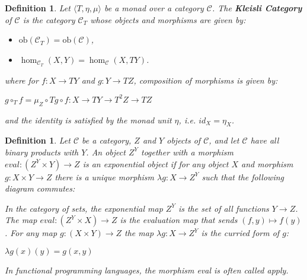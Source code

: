 \documentclass[11pt]{report}
\newcommand{\mcC}{\mathcal{C}}
\newcommand{\ob}{\text{ob}}
\newtheorem{defn}[thm]{Definition} %
\begin{document}
\begin{defn}
  Let $\langle T, \eta, \mu \rangle$ be a monad over a category $\mcC$. The \textbf{Kleisli Category }of $\mcC$ is the category $\mcC_T$ whose objects and morphisms are given by:
  \begin{itemize}
  \item $\ob(\mcC_T) = \ob(\mcC)$,
  \item $\hom_{\mcC_T}(X, Y) = \hom_{\mcC}(X, TY)$.
  \end{itemize}
  where for $f: X \to TY$ and $g: Y \to TZ$, composition of morphisms is given by:
  \begin{center}
    $g \circ_T f = \mu_Z \circ Tg \circ f: X \to TY \to T^2Z \to TZ$
  \end{center}
  and the identity is satisfied by the monad unit $\eta$, i.e. $id_X = \eta_X$.
\end{defn}

\begin{defn}
  Let $\mcC$ be a category, $Z$ and $Y$ objects of $\mcC$, and let $\mcC$ have all binary products with $Y$. An object $Z^Y$ together with a morphism $eval: (Z^Y \times Y) \to Z$ is an exponential object if for any object $X$ and morphism $g: X \times Y \to Z$ there is a unique morphism $\lambda g : X \to Z^Y$ such that the following diagram commutes: 
  \begin{center}
  \end{center} 
  In the category of sets, the exponential map $Z^Y$ is the set of all functions $Y \to Z$. The map $eval:(Z^Y \times X) \to Z$ is the evaluation map that sends $(f, y) \mapsto f(y)$. For any map $g: (X \times Y) \to Z$ the map
  $\lambda g: X \to Z^Y$ is the curried form of $g$:
  \begin{center}
    $\lambda g(x)(y) = g(x,y)$
  \end{center}
  In functional programming languages, the morphism eval is often called apply.
\end{defn}
\end{document}
